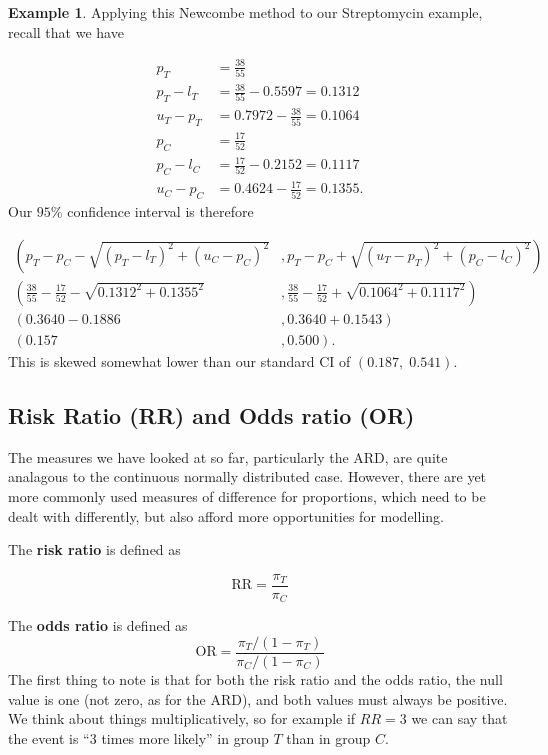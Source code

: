 \documentclass[
  openany]{book}
\theoremstyle{definition}
\theoremstyle{definition}
\newtheorem{example}{Example}[chapter]
\theoremstyle{definition}
\theoremstyle{definition}
\theoremstyle{remark}
\begin{document}
\begin{example}
Applying this Newcombe method to our Streptomycin example, recall that we have

\[
\begin{aligned}
p_T & = \frac{38}{55}\\
p_T - l_T & = \frac{38}{55} - 0.5597 = 0.1312\\
u_T - p_T & = 0.7972 - \frac{38}{55} = 0.1064\\
p_C & = \frac{17}{52} \\
p_C - l_C & = \frac{17}{52}  - 0.2152 = 0.1117\\
u_C - p_C & = 0.4624 - \frac{17}{52} = 0.1355.
\end{aligned}
\]
Our \(95\%\) confidence interval is therefore

\[
\begin{aligned}
\left(p_T - p_C - \sqrt{\left(p_T-l_T\right)^2 + \left(u_C - p_C\right)^2}\right.&,\left. p_T - p_C + \sqrt{\left(u_T - p_T\right)^2 + \left(p_C - l_C\right)^2}\right)\\
\left(\frac{38}{55}-\frac{17}{52} - \sqrt{0.1312^2 + 0.1355^2}\right.&,\left.\frac{38}{55}-\frac{17}{52} + \sqrt{0.1064^2 + 0.1117^2}\right)\\
\left(0.3640 - 0.1886 \right.&,\left. 0.3640+ 0.1543\right)\\
\left(0.157 \right.&,\left.0.500\right).
\end{aligned}
\]
This is skewed somewhat lower than our standard CI of \(\left(0.187,\;0.541\right).\)
\end{example}

\hypertarget{risk-ratio-rr-and-odds-ratio-or}{%
\subsection{Risk Ratio (RR) and Odds ratio (OR)}\label{risk-ratio-rr-and-odds-ratio-or}}

The measures we have looked at so far, particularly the ARD, are quite analagous to the continuous normally distributed case. However, there are yet more commonly used measures of difference for proportions, which need to be dealt with differently, but also afford more opportunities for modelling.

The \textbf{risk ratio} is defined as

\[\text{RR} = \frac{\pi_T}{\pi_C}\]

The \textbf{odds ratio} is defined as
\[\text{OR} = \frac{\pi_T/\left(1-\pi_T\right)}{\pi_C/\left(1-\pi_C\right)}\]
The first thing to note is that for both the risk ratio and the odds ratio, the null value is one (not zero, as for the ARD), and both values must always be positive. We think about things multiplicatively, so for example if \(RR=3\) we can say that the event is ``3 times more likely'' in group \(T\) than in group \(C\).
\end{document}
